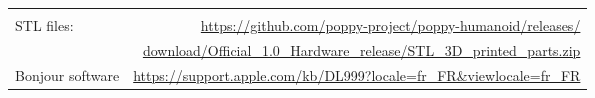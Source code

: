 \documentclass{article}
\begin{document}
\begin{tabular}{lr}
   & \\

STL files: & \href{https://github.com/poppy-project/poppy-humanoid/releases/download/Official_1.0_Hardware_release/STL_3D_printed_parts.zip}{https://github.com/poppy-project/poppy-humanoid/releases/} \\ 
 & \href{https://github.com/poppy-project/poppy-humanoid/releases/download/Official_1.0_Hardware_release/STL_3D_printed_parts.zip}{download/Official\_1.0\_Hardware\_release/STL\_3D\_printed\_parts.zip}
\\

Bonjour software &\url{https://support.apple.com/kb/DL999?locale=fr_FR&viewlocale=fr_FR} \\
 
\end{tabular} 
\end{document}
